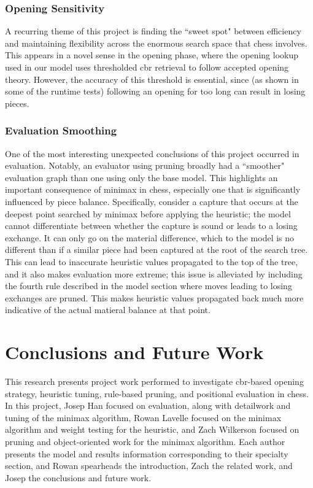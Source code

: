 \documentclass[letterpaper]{article}
\begin{document}
\subsubsection{Opening Sensitivity}
A recurring theme of this project is finding the ``sweet spot" between efficiency and maintaining flexibility across the enormous search space that chess involves.  This appears in a novel sense in the opening phase, where the opening lookup used in our model uses thresholded \acrshort{cbr} retrieval to follow accepted opening theory.  However, the accuracy of this threshold is essential, since (as shown in some of  the runtime tests) following an opening for too long can result in losing pieces.

\subsubsection{Evaluation Smoothing}
One of the most interesting unexpected conclusions of this project occurred in evaluation.  Notably, an evaluator using pruning broadly had a ``smoother" evaluation graph than one using only the base model.  This highlights an important consequence of minimax in chess, especially one that is significantly influenced by piece balance.  Specifically, consider a capture that occurs at the deepest point searched by minimax before applying the heuristic; the model cannot differentiate between whether the capture is sound or leads to a losing exchange.  It can only go on the material difference, which to the model is no different than if a similar piece had been captured at the root of the search tree.  This can lead to inaccurate heuristic values propagated to the top of the tree, and it also makes evaluation more extreme; this issue is alleviated by including the fourth rule described in the model section where moves leading to losing exchanges are pruned.  This makes heuristic values propagated back much more indicative of the actual matieral balance at that point.

\section{Conclusions and Future Work}
This research presents project work performed to investigate \acrshort{cbr}-based opening strategy, heuristic tuning, rule-based pruning, and positional evaluation in chess.  In this project, Josep Han focused on evaluation, along with detailwork and tuning of the minimax algorithm, Rowan Lavelle focused on the minimax algorithm and weight testing for the heuristic, and Zach Wilkerson focused on pruning and object-oriented work for the minimax algorithm.  Each author presents the model and results information corresponding to their specialty section, and Rowan spearheads the introduction, Zach the related work, and Josep the conclusions and future work.
\end{document}
